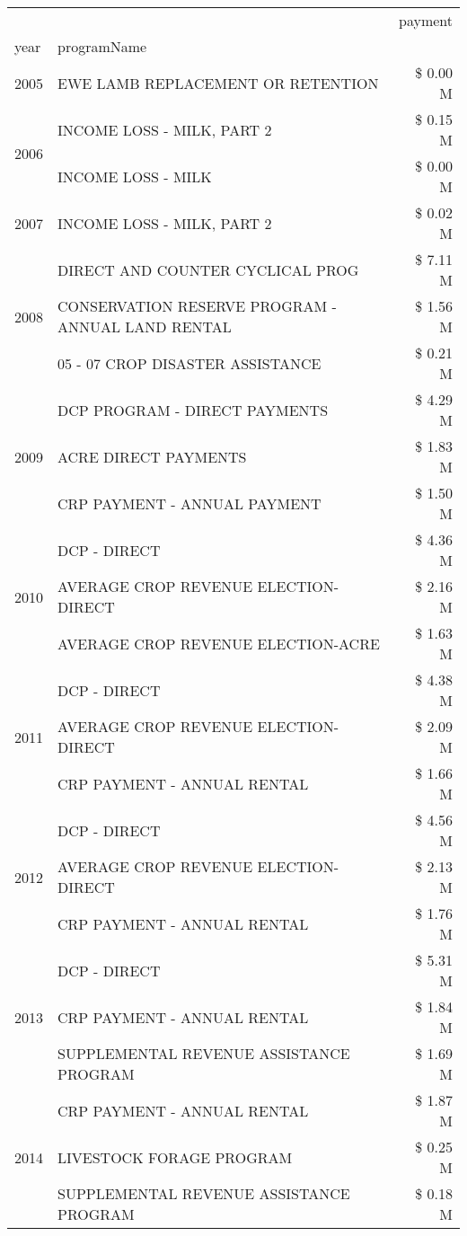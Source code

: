 \begin{tabular}{llr}
\toprule
 &  & payment \\
year & programName &  \\
\midrule
2005 & EWE LAMB REPLACEMENT OR RETENTION & \$ 0.00 M \\
\cline{1-3}
\multirow[t]{2}{*}{2006} & INCOME LOSS - MILK, PART 2 & \$ 0.15 M \\
 & INCOME LOSS - MILK & \$ 0.00 M \\
\cline{1-3}
2007 & INCOME LOSS - MILK, PART 2 & \$ 0.02 M \\
\cline{1-3}
\multirow[t]{3}{*}{2008} & DIRECT AND COUNTER CYCLICAL PROG & \$ 7.11 M \\
 & CONSERVATION RESERVE PROGRAM - ANNUAL LAND RENTAL & \$ 1.56 M \\
 & 05 - 07 CROP DISASTER ASSISTANCE & \$ 0.21 M \\
\cline{1-3}
\multirow[t]{3}{*}{2009} & DCP PROGRAM - DIRECT PAYMENTS & \$ 4.29 M \\
 & ACRE DIRECT PAYMENTS & \$ 1.83 M \\
 & CRP PAYMENT - ANNUAL PAYMENT & \$ 1.50 M \\
\cline{1-3}
\multirow[t]{3}{*}{2010} & DCP - DIRECT & \$ 4.36 M \\
 & AVERAGE CROP REVENUE ELECTION-DIRECT & \$ 2.16 M \\
 & AVERAGE CROP REVENUE ELECTION-ACRE & \$ 1.63 M \\
\cline{1-3}
\multirow[t]{3}{*}{2011} & DCP - DIRECT & \$ 4.38 M \\
 & AVERAGE CROP REVENUE ELECTION-DIRECT & \$ 2.09 M \\
 & CRP PAYMENT - ANNUAL RENTAL & \$ 1.66 M \\
\cline{1-3}
\multirow[t]{3}{*}{2012} & DCP - DIRECT & \$ 4.56 M \\
 & AVERAGE CROP REVENUE ELECTION-DIRECT & \$ 2.13 M \\
 & CRP PAYMENT - ANNUAL RENTAL & \$ 1.76 M \\
\cline{1-3}
\multirow[t]{3}{*}{2013} & DCP - DIRECT & \$ 5.31 M \\
 & CRP PAYMENT - ANNUAL RENTAL & \$ 1.84 M \\
 & SUPPLEMENTAL REVENUE ASSISTANCE PROGRAM & \$ 1.69 M \\
\cline{1-3}
\multirow[t]{3}{*}{2014} & CRP PAYMENT - ANNUAL RENTAL & \$ 1.87 M \\
 & LIVESTOCK FORAGE PROGRAM & \$ 0.25 M \\
 & SUPPLEMENTAL REVENUE ASSISTANCE PROGRAM & \$ 0.18 M \\

\end{tabular}
